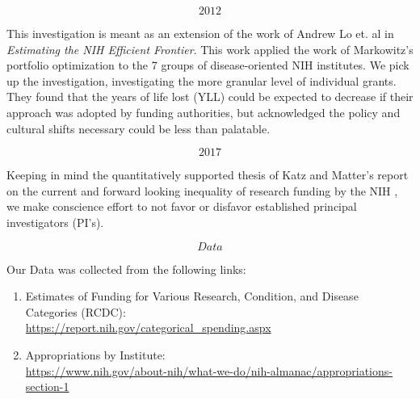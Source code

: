 \[2012\]

This investigation is meant as an extension of the work of Andrew Lo et. al in \textit{Estimating the NIH Efficient Frontier}\cite{lo_2012}. This work applied the work of Markowitz's portfolio optimization \cite{markowitz} to the 7 groups of disease-oriented NIH institutes. We pick up the investigation, investigating the more granular level of individual grants. They found that the years of life lost (YLL) could be expected to decrease if their approach was adopted by funding authorities, but acknowledged the policy and cultural shifts necessary could be less than palatable. 

\[2017\]

Keeping in mind the quantitatively supported thesis of Katz and Matter's report on the current and forward looking inequality of research funding by the NIH \cite{bio_elite}, we make conscience effort to not favor or disfavor established principal investigators (PI's). 

\[Data\]

Our Data was collected from the following links:

\begin{enumerate}

\item Estimates of Funding for Various Research, Condition, and Disease Categories (RCDC): \\ \url{https://report.nih.gov/categorical_spending.aspx}

\item Appropriations by Institute: \\ \url{https://www.nih.gov/about-nih/what-we-do/nih-almanac/appropriations-section-1}
	\end{enumerate}
